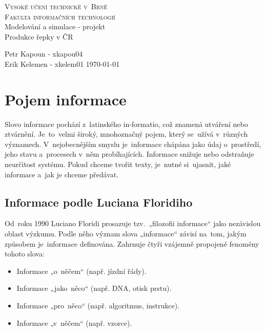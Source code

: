 \documentclass[11pt,a4paper,titlepage]{article}
\begin{document}
\begin{titlepage}
\begin{center}
    {\LARGE\textsc{Vysoké učení technické v~Brně}}\\
    \smallskip
    {\Large\textsc{Fakulta informačních technologií}}\\
    \bigskip
    \LARGE{Modelování a simulace - projekt}\\
    \smallskip
    \Huge{Produkce řepky v ČR}\\
\end{center}
    {\Large Petr Kapoun - xkapou04 \\ Erik Kelemen - xkelem01 \hfill \today }
\end{titlepage}

\tableofcontents
\newpage

\section{Pojem informace}
Slovo informace pochází z~latinského in-formatio, což znamená utváření nebo ztvárnění. Je~to~velmi široký, mnohoznačný pojem, který se~užívá v~různých významech. V~nejobecnějším smyslu je~informace chápána jako údaj o~prostředí, jeho stavu a~procesech v~něm probíhajících. Informace snižuje nebo odstraňuje neurčitost systému.\cite{wiki_informace}
Pokud chceme tvořit texty, je~nutné si~ujasnit, jaké informace a~jak je chceme předávat.
\subsection{Informace podle Luciana Floridiho}
Od~roku 1990 Luciano Floridi prosazuje tzv.~„filozofii informace“ jako nezávislou oblast výzkumu. Podle něho význam slova „informace“ závisí na~tom, jakým způsobem je~informace definována. Zahrnuje čtyři vzájemně propojené fenomény tohoto slova:
\begin{itemize}
  \item Informace „o~něčem“ (např. jízdní řády).
  \item Informace „jako~něco“ (např. DNA, otisk prstu).
  \item Informace „pro~něco“ (např. algoritmus, instrukce).
  \item Informace „v~něčem“ (např. vzorce). \cite{Havac_informace}
\end{itemize}
\end{document}
